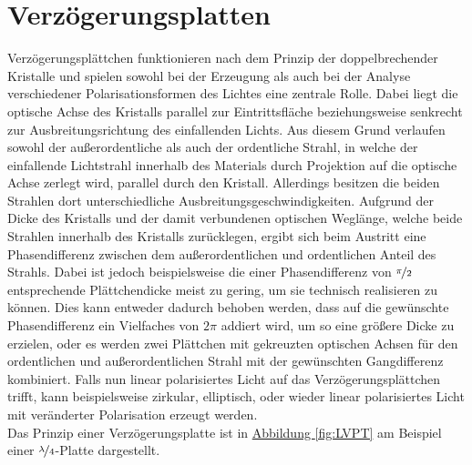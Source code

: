 \documentclass[
class=book,
accentcolor=1b,
custommargins=geometry,
fontsize=11pt,
thesis={type=Versuchsanleitung},
ruledheaders=all,
headline=false,
instbox=false,
marginpar=false,
title=small,
ignore-missing-data=true,
twoside=false,
logofile=apqdesign/tuda_logo.pdf,
pdfa=false %
]{apqpub}
\begin{document}
	\section{Verzögerungsplatten} \label{ssec:lambdaplatte}
Verzögerungsplättchen funktionieren nach dem Prinzip der doppelbrechender Kristalle und spielen sowohl bei der Erzeugung als auch bei der Analyse verschiedener Polarisationsformen des Lichtes eine zentrale Rolle.
Dabei liegt die optische Achse des Kristalls parallel zur Eintrittsfläche beziehungsweise senkrecht zur Ausbreitungsrichtung des einfallenden Lichts. 
Aus diesem Grund verlaufen sowohl der außerordentliche als auch der ordentliche Strahl, in welche der einfallende Lichtstrahl innerhalb des Materials durch Projektion auf die optische Achse zerlegt wird, parallel durch den Kristall.
Allerdings besitzen die beiden Strahlen dort unterschiedliche Ausbreitungsgeschwindigkeiten.
Aufgrund der Dicke des Kristalls und der damit verbundenen optischen Weglänge, welche beide Strahlen innerhalb des Kristalls zurücklegen, ergibt sich beim Austritt eine Phasendifferenz zwischen dem außerordentlichen und ordentlichen Anteil des Strahls. 
Dabei ist jedoch beispielsweise die einer Phasendifferenz von $\nicefrac{\pi}{2}$ entsprechende Plättchendicke meist zu gering, um sie technisch realisieren zu können. 
Dies kann entweder dadurch behoben werden, dass auf die gewünschte Phasendifferenz ein Vielfaches von $2\pi$ addiert wird, um so eine größere Dicke zu erzielen, oder es werden zwei Plättchen mit gekreuzten optischen Achsen für den ordentlichen und außerordentlichen Strahl mit der gewünschten Gangdifferenz kombiniert.
Falls nun linear polarisiertes Licht auf das Verzögerungsplättchen trifft, kann beispielsweise zirkular, elliptisch, oder wieder linear polarisiertes Licht mit veränderter Polarisation erzeugt werden.\cite{OLL}\\
Das Prinzip einer Verzögerungsplatte ist in \hyperref[fig:LVPT]{Abbildung \ref{fig:LVPT}} am Beispiel einer $\nicefrac{\lambda}{4}$-Platte dargestellt.
\vspace{7pt}
\end{document}
